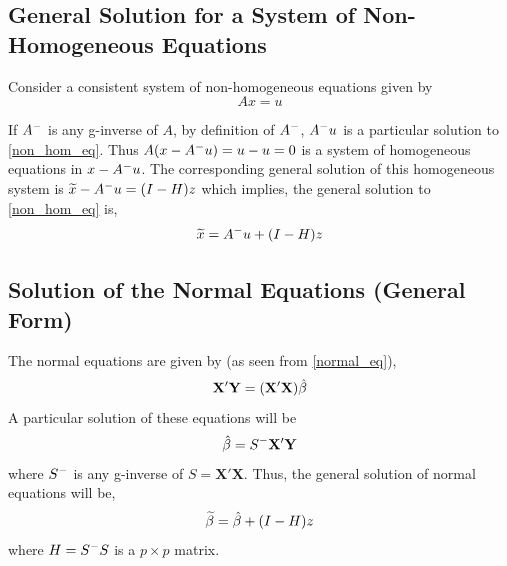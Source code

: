 \documentclass[10pt, a4paper]{article}
\begin{document}
\subsection[System of Non-Homogeneous Equations]{General Solution for a System of Non-Homogeneous Equations}
Consider a consistent system of non-homogeneous equations given by
\begin{equation}
	Ax = u \label{non_hom_eq}
\end{equation}

If \( A^{-} \) is any g-inverse of \( A \), by definition of \( A^{-} \), \( A^{-}u \) is a particular solution to \eqref{non_hom_eq}. 
Thus \( A(x - A^{-}u) = u - u = 0 \) is a system of homogeneous equations in \( x - A^{-}u \).
The corresponding general solution of this homogeneous system is \( \widetilde{x} - A^{-}u = (I-H)z \) which implies, the general solution to \eqref{non_hom_eq} is, 
\begin{equation}
	\widetilde{x} = A^{-}u + (I-H)z \label{old_gen_sol}
\end{equation}

\subsection{Solution of the Normal Equations (General Form)}
The normal equations are given by (as seen from \eqref{normal_eq}), 
\[ \mathbf{X}'\mathbf{Y} = (\mathbf{X}'\mathbf{X}) \hat{\beta} \] 
A particular solution of these equations will be 
\[ \hat{\beta} = S^{-}\mathbf{X}'\mathbf{Y} \] where \( S^{-} \) is any g-inverse of \( S= \mathbf{X}'\mathbf{X}\).
Thus, the general solution of normal equations will be, 
\begin{equation}
	\widetilde{\beta} = \hat{\beta} + (I-H)z \label{gen_sol}
\end{equation}
where \( H = S^{-}S \) is a \( p \times p \) matrix.
\end{document}
